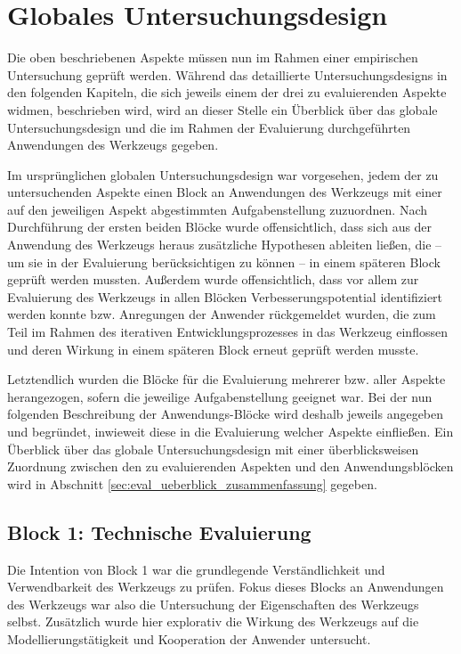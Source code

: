 \section{Globales Untersuchungsdesign}
\label{sec:globales_untersuchungsdesign}

Die oben beschriebenen Aspekte müssen nun im Rahmen einer empirischen Untersuchung geprüft werden. Während das detaillierte Untersuchungsdesigns in den folgenden Kapiteln, die sich jeweils einem der drei zu evaluierenden Aspekte widmen, beschrieben wird, wird an dieser Stelle ein Überblick über das globale Untersuchungsdesign und die im Rahmen der Evaluierung durchgeführten Anwendungen des Werkzeugs gegeben.

Im ursprünglichen globalen Untersuchungsdesign war vorgesehen, jedem der zu untersuchenden Aspekte einen Block an Anwendungen des Werkzeugs mit einer auf den jeweiligen Aspekt abgestimmten Aufgabenstellung zuzuordnen. Nach Durchführung der ersten beiden Blöcke wurde offensichtlich, dass sich aus der Anwendung des Werkzeugs heraus zusätzliche Hypothesen ableiten ließen, die -- um sie in der Evaluierung berücksichtigen zu können -- in einem späteren Block geprüft werden mussten. Außerdem wurde offensichtlich, dass vor allem zur Evaluierung des Werkzeugs in allen Blöcken Verbesserungspotential identifiziert werden konnte bzw. Anregungen der Anwender rückgemeldet wurden, die zum Teil im Rahmen des iterativen Entwicklungsprozesses in das Werkzeug einflossen und deren Wirkung in einem späteren Block erneut geprüft werden musste. 

Letztendlich wurden die Blöcke für die Evaluierung mehrerer bzw. aller Aspekte herangezogen, sofern die jeweilige Aufgabenstellung geeignet war. Bei der nun folgenden Beschreibung der Anwendungs-Blöcke wird deshalb jeweils angegeben und begründet, inwieweit diese in die Evaluierung welcher Aspekte einfließen. Ein Überblick über das globale Untersuchungsdesign mit einer überblicksweisen Zuordnung zwischen den zu evaluierenden Aspekten und den Anwendungsblöcken wird in Abschnitt \ref{sec:eval_ueberblick_zusammenfassung} gegeben.

\subsection{Block 1: Technische Evaluierung}
\label{sub:eval_1}

Die Intention von Block 1 war die grundlegende Verständlichkeit und Verwendbarkeit des Werkzeugs zu prüfen. Fokus dieses Blocks an Anwendungen des Werkzeugs war also die Untersuchung der Eigenschaften des Werkzeugs selbst. Zusätzlich wurde hier explorativ die Wirkung des Werkzeugs auf die Modellierungstätigkeit und Kooperation der Anwender untersucht.

